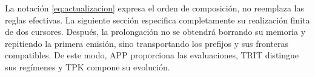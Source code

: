 La notación \eqref{eq:actualizacion} expresa el orden de composición, no reemplaza las reglas efectivas. La siguiente sección especifica completamente su realización finita de dos cursores. Después, la prolongación no se obtendrá borrando su memoria y repitiendo la primera emisión, sino transportando los prefijos y sus fronteras compatibles. De este modo, APP proporciona las evaluaciones, TRIT distingue sus regímenes y TPK compone su evolución.




